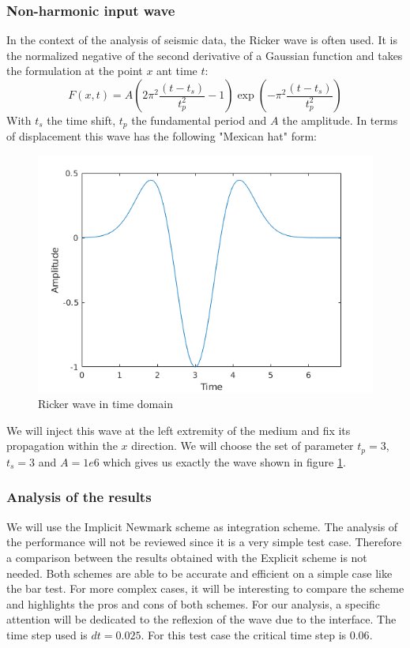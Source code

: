 \subsubsection{Non-harmonic input wave}
In the context of the analysis of seismic data, the Ricker wave is often used. It is the normalized negative of the second derivative of a Gaussian function and takes the formulation at the point $x$ ant time $t$:
\begin{equation}
F(x,t) = A \left(2 \pi^2 \frac{(t-t_s)}{t_p^2} -1\right) \exp\left(-\pi^2 \frac{(t-t_s)}{t_p^2}\right)
\end{equation}   
With $t_s$ the time shift, $t_p$ the fundamental period and $A$ the amplitude.
In terms of displacement this wave has the following "Mexican hat" form:
\begin{figure}[H]
  \centering
  \includegraphics[scale=0.8]{images/ricker.png}
  \caption{Ricker wave in time domain}
  \label{fig:Ricker}
\end{figure}  
We will inject this wave at the left extremity of the medium and fix its propagation within the $x$ direction. We will choose the set of parameter $t_p = 3$, $t_s = 3$ and $A = 1e6$ which gives us exactly the wave shown in figure \ref{fig:Ricker}.
\subsubsection{Analysis of the results}
We will use the Implicit Newmark scheme as integration scheme. The analysis of the performance will not be reviewed since it is a very simple test case. Therefore a comparison between the results obtained with the Explicit scheme is not needed. Both schemes are able to be accurate and efficient on a simple case like the bar test. For more complex cases, it will be interesting to compare the scheme and highlights the pros and cons of both schemes. For our analysis, a specific attention will be dedicated to the reflexion of the wave due to the interface. The time step used is $dt = 0.025$. For this test case the critical time step is $0.06$.\\ 

